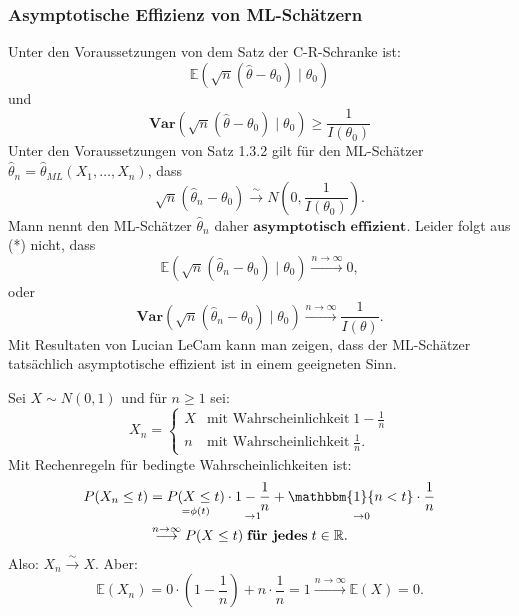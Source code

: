 \documentclass[10pt]{article}
\newcommand{\FZV}{X_1, \ldots, X_n} %
\newcommand{\IR}{\mathbb{R}} %
\newcommand{\EW}{\mathbb{E}} %
\newcommand{\KV}{\overset{\sim} \longrightarrow} %
\newcommand{\eqname}[1]{\tag*{#1}}%
\newcommand{\Var}{\textbf{Var}} %
\newenvironment{BSP}[1][]
{\begin{Beispiel}[frametitle=#1]}{\end{Beispiel}}
\begin{document}
	\subsubsection{Asymptotische Effizienz von ML-Schätzern}
	
	Unter den Voraussetzungen von dem Satz der C-R-Schranke ist:
	\begin{equation*}
		\EW(\sqrt{n}(\hat{\theta}-\theta_0)\mid \theta_0)
	\end{equation*}
	und 
	\begin{equation*}
		\Var(\sqrt{n}(\hat{\theta}-\theta_0)\mid \theta_0) \geq \frac{1}{I(\theta_0)}
	\end{equation*}
	Unter den Voraussetzungen von Satz 1.3.2 gilt für den ML-Schätzer $\hat{\theta}_n = \hat{\theta}_{ML}(\FZV)$, dass
	\begin{equation*}
		\sqrt{n}(\hat{\theta}_n-\theta_0) \KV N\left(0,\frac{1}{I(\theta_0)}\right). \eqname{(*)}
	\end{equation*}
	Mann nennt den ML-Schätzer $\hat{\theta}_n$ daher $\textbf{asymptotisch effizient}$.
	Leider folgt aus (*) nicht, dass
	\begin{equation*}
		\EW(\sqrt{n}(\hat{\theta}_n-\theta_0)\mid \theta_0) \overset{n\rightarrow \infty}{\longrightarrow} 0,
	\end{equation*}
	oder
	\begin{equation*}
		\Var(\sqrt{n}(\hat{\theta}_n-\theta_0)\mid \theta_0) \overset{n\rightarrow \infty}{\longrightarrow} \frac{1}{I(\theta)}.
	\end{equation*}
	Mit Resultaten von Lucian LeCam kann man zeigen, dass der ML-Schätzer tatsächlich asymptotische effizient ist in einem geeigneten Sinn. 
	
	\begin{BSP}[Beispiel 1.4.7 (Asymptotische Effizienz)]
		Sei $X \sim N(0,1)$ und für $n \geq 1$ sei:
		\begin{equation*}
			X_n =
			\begin{cases}
				X &\text{mit Wahrscheinlichkeit} \; 1-\frac{1}{n}\\
				n &\text{mit Wahrscheinlichkeit} \; \frac{1}{n}.
			\end{cases}
		\end{equation*}
		Mit Rechenregeln für bedingte Wahrscheinlichkeiten ist:
		\begin{equation*}
			\begin{split}
				P(X_n \leq t) &= \underset{= \phi(t)}{P(X \leq t)} \cdot \underset{\rightarrow 1}{1-\frac{1}{n}} + \underset{\rightarrow 0}{\mathbbm{1} \{n < t\} \cdot \frac{1}{n}}\\
				&\overset{n \rightarrow \infty}{\longrightarrow} P(X \leq t) \; \textbf{für jedes} \; t \in \IR.
			\end{split}
		\end{equation*}
		Also: $X_n \KV X$. 
		Aber:
		\begin{equation*}
			\EW(X_n) = 0 \cdot \left(1- \frac{1}{n}\right) + n \cdot \frac{1}{n} = 1 \overset{n \rightarrow \infty}{\longrightarrow} \EW(X) = 0.
		\end{equation*}
	\end{BSP}
\end{document}
